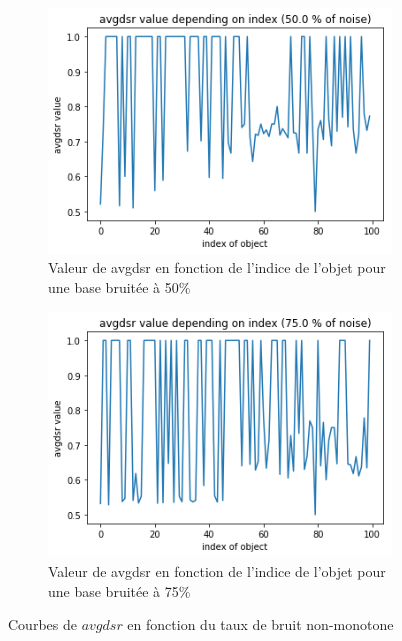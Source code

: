\documentclass[a4paper]{article}
\begin{document}
\begin{figure}[H]
    \begin{subfigure}[c]{0.46\textwidth}
	    \centering 
	    \includegraphics[width=\textwidth]{images/avgdsr_50.png}
        \caption{Valeur de avgdsr en fonction de l'indice de l'objet pour une base
        bruitée à 50\%}
        \label{img:avgdsr50}
    \end{subfigure}
    \begin{subfigure}[c]{0.46\textwidth}
    	\centering
    	\includegraphics[width=\textwidth]{images/avgdsr_75.png}
        \caption{Valeur de avgdsr en fonction de l'indice de l'objet pour une base
        bruitée à 75\%}
        \label{img:avgdsr75}
    \end{subfigure}
\caption{Courbes de $avgdsr$ en fonction du taux de bruit non-monotone}
\end{figure}
\end{document}

